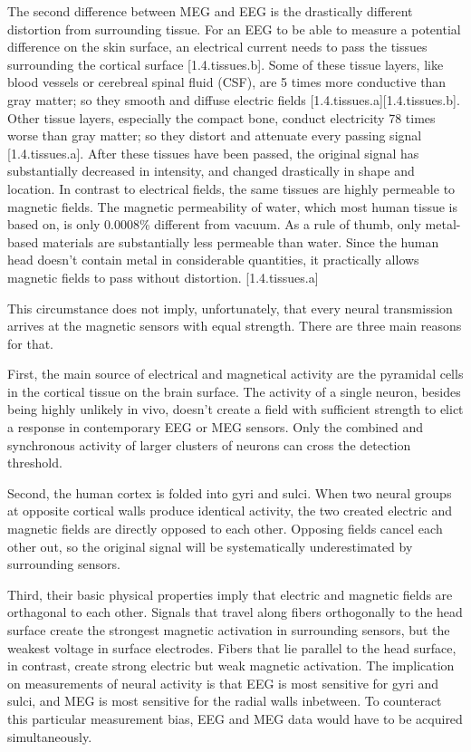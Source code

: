 The second difference between MEG and EEG is the drastically different distortion from surrounding tissue.
For an EEG to be able to measure a potential difference on the skin surface, an electrical current needs to pass the tissues surrounding the cortical surface [1.4.tissues.b].
Some of these tissue layers, like blood vessels or cerebreal spinal fluid (CSF), are 5 times more conductive than gray matter; so they smooth and diffuse electric fields [1.4.tissues.a][1.4.tissues.b].
Other tissue layers, especially the compact bone, conduct electricity 78 times worse than gray matter; so they distort and attenuate every passing signal [1.4.tissues.a].
After these tissues have been passed, the original signal has substantially decreased in intensity, and changed drastically in shape and location.
In contrast to electrical fields, the same tissues are highly permeable to magnetic fields.
The magnetic permeability of water, which most human tissue is based on, is only 0.0008\% different from vacuum.
As a rule of thumb, only metal-based materials are substantially less permeable than water.
Since the human head doesn't contain metal in considerable quantities, it practically allows magnetic fields to pass without distortion. [1.4.tissues.a]

This circumstance does not imply, unfortunately, that every neural transmission arrives at the magnetic sensors with equal strength.
There are three main reasons for that.

First, the main source of electrical and magnetical activity are the pyramidal cells in the cortical tissue on the brain surface.
The activity of a single neuron, besides being highly unlikely in vivo, doesn't create a field with sufficient strength to elict a response in contemporary EEG or MEG sensors.
Only the combined and synchronous activity of larger clusters of neurons can cross the detection threshold.

Second, the human cortex is folded into gyri and sulci.
When two neural groups at opposite cortical walls produce identical activity, the two created electric and magnetic fields are directly opposed to each other.
Opposing fields cancel each other out, so the original signal will be systematically underestimated by surrounding sensors.

Third, their basic physical properties imply that electric and magnetic fields are orthagonal to each other.
Signals that travel along fibers orthogonally to the head surface create the strongest magnetic activation in surrounding sensors, but the weakest voltage in surface electrodes.
Fibers that lie parallel to the head surface, in contrast, create strong electric but weak magnetic activation.
The implication on measurements of neural activity is that EEG is most sensitive for gyri and sulci, and MEG is most sensitive for the radial walls inbetween.
To counteract this particular measurement bias, EEG and MEG data would have to be acquired simultaneously.

